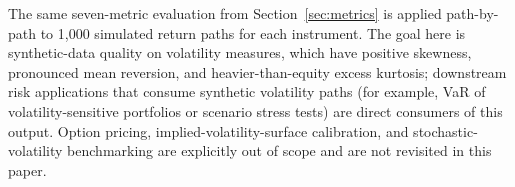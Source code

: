 The same seven-metric evaluation from Section~\ref{sec:metrics} is applied path-by-path to 1{,}000 simulated return paths for each instrument.
The goal here is synthetic-data quality on volatility measures, which have positive skewness, pronounced mean reversion, and heavier-than-equity excess kurtosis; downstream risk applications that consume synthetic volatility paths (for example, VaR of volatility-sensitive portfolios or scenario stress tests) are direct consumers of this output.
Option pricing, implied-volatility-surface calibration, and stochastic-volatility benchmarking are explicitly out of scope and are not revisited in this paper.
